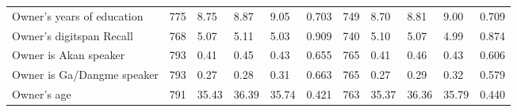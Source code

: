 \begin{table}[H]
{\begin{tabular}{lllllllllll}
\hspace{1em}Owner's years of education & 775 & 8.75 & 8.87 & 9.05 & 0.703 & 749 & 8.70 & 8.81 & 9.00 & 0.709\\
\hspace{1em}Owner's digitspan Recall & 768 & 5.07 & 5.11 & 5.03 & 0.909 & 740 & 5.10 & 5.07 & 4.99 & 0.874\\
\hspace{1em}Owner is Akan speaker & 793 & 0.41 & 0.45 & 0.43 & 0.655 & 765 & 0.41 & 0.46 & 0.43 & 0.606\\
\hspace{1em}Owner is Ga/Dangme speaker & 793 & 0.27 & 0.28 & 0.31 & 0.663 & 765 & 0.27 & 0.29 & 0.32 & 0.579\\
\hspace{1em}Owner's age & 791 & 35.43 & 36.39 & 35.74 & 0.421 & 763 & 35.37 & 36.36 & 35.79 & 0.440\\
\bottomrule
\end{tabular}}
\end{table}
